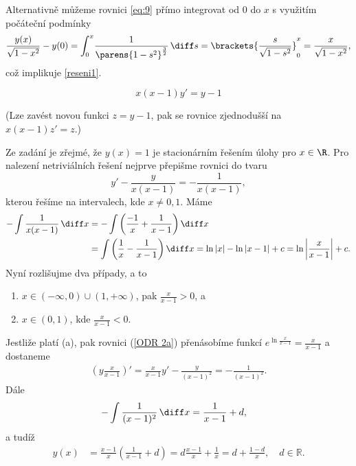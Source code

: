 \documentclass[answers]{exam}
\begin{document}
\begin{questions}
\begin{solution}
		Alternativně můžeme rovnici \eqref{eq:9} přímo integrovat od $0$ do $x$ s využitím počáteční podmínky
		\begin{equation*}
			\frac{y(x)}{\sqrt{1 - x^2}} - y(0)
			=
			\int_0^x \! \frac{1}{\parens{1 - s^2}^{\frac{3}{2}}} \, \diff s
			=
			\brackets{\frac{s}{\sqrt{1 - s^2}}}_0^x
			=
			\frac{x}{\sqrt{1 - x^2}},
		\end{equation*}
		což implikuje \eqref{reseni1}.
	\end{solution}
	
	\question
	\begin{equation*}
		x(x-1)y'=y-1
	\end{equation*}
	
	\begin{solution}
		(Lze zav\'est novou funkci $z=y-1$, pak se rovnice zjednodu\v s\v s\'i na $x(x-1)z'=z$.) 
		
		Ze zadání je zřejmé, že $y(x) = 1$ je stacionárním řešením úlohy pro $x \in \R$. Pro nalezení netriviálních řešení nejprve p\v repi\v sme rovnici do tvaru
		\begin{equation}\label{ODR 2a}
		y'-\frac{y}{x(x-1)}=-\frac{1}{x(x-1)},
		\end{equation}
		kterou řešíme na intervalech, kde $x \neq 0, 1$. M\'ame
		\begin{align*}
		-\int\frac{1}{x(x-1)} \, \diff x&=-\int\bigg(\frac{-1}{x}+\frac{1}{x-1}\bigg) \, \diff x \\
		&=\int\bigg(\frac{1}{x}-\frac{1}{x-1}\bigg)\, \diff x =\ln|x|-\ln|x-1|+c=\ln\left|\frac{x}{x-1}\right|+c. 
		\end{align*}
		Nyn\'i rozli\v sujme dva p\v r\'ipady, a to 
		\begin{enumerate}[label=(\alph*)]
		 \item  $x\in(-\infty,0)\cup(1,+\infty)$, pak $\frac{x}{x-1}>0$, a 
		 \item  $x\in(0,1)$, kde $\frac{x}{x-1}<0$.
		\end{enumerate}
		
		Jestli\v ze plat\'i (a), pak rovnici (\ref{ODR 2a}) p\v ren\'asob\'ime funkc\'i $e^{\ln\frac{x}{x-1}}=\frac{x}{x-1}$ a dostaneme
		\begin{align*}
		\left(y\frac{x}{x-1}\right)'=\frac{x}{x-1}y'-\frac{y}{(x-1)^2}=-\frac{1}{(x-1)^2}. 
		\end{align*}
		D\'ale
		\begin{align*}
		-\int\frac{1}{(x-1)^2} \, \diff x&=\frac{1}{x-1}+d,
		\end{align*}
		a tud\'i\v z 
		\begin{align*}
		y(x)&=\frac{x-1}{x}\left(\frac{1}{x-1}+d\right)=d\frac{x-1}{x}+\frac{1}{x}=d+\frac{1-d}{x},\quad d\in\mathbb R. 
		\end{align*}
		

\end{solution}
\end{questions}
\end{document}
